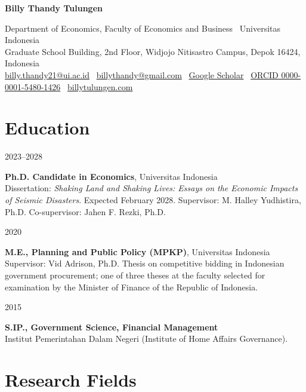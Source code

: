 \documentclass[11pt,a4paper]{article}
\newlength{\datecol}\setlength{\datecol}{0.155\textwidth}
\newlength{\bodycol}\setlength{\bodycol}{0.815\textwidth}
\newcommand{\entry}[2]{%
  \noindent
  \begin{minipage}[t]{\datecol}%
    \strut\raggedright\small\color{muted}#1%
  \end{minipage}%
  \hfill
  \begin{minipage}[t]{\bodycol}%
    \strut #2%
  \end{minipage}%
  \par\vspace{0.16em}}
\newcommand{\org}[1]{{\small\color{muted}#1}}
\begin{document}
{\LARGE\bfseries Billy Thandy Tulungen}

\vspace{0.45em}
{\color{muted}\small
Department of Economics, Faculty of Economics and Business \textperiodcentered\
Universitas Indonesia\\
Graduate School Building, 2nd Floor, Widjojo Nitisastro Campus, Depok 16424,
Indonesia\\[0.25em]
\href{mailto:billy.thandy21@ui.ac.id}{billy.thandy21@ui.ac.id}
\textperiodcentered\
\href{mailto:billythandy@gmail.com}{billythandy@gmail.com}
\textperiodcentered\
\href{https://scholar.google.com/citations?user=LchRWJsAAAAJ}{Google Scholar}
\textperiodcentered\
\href{https://orcid.org/0000-0001-5480-1426}{ORCID 0000-0001-5480-1426}
\textperiodcentered\
\mbox{\href{https://billytulungen.com}{billytulungen.com}}}

\vspace{0.5em}

\section{Education}

\entry{2023--2028}{%
  \textbf{Ph.D. Candidate in Economics}, Universitas Indonesia\\
  \org{Dissertation: \emph{Shaking Land and Shaking Lives: Essays on the
  Economic Impacts of Seismic Disasters}. Expected February 2028.
  Supervisor: M. Halley Yudhistira, Ph.D. Co-supervisor: Jahen F. Rezki,
  Ph.D.}}

\entry{2020}{%
  \textbf{M.E., Planning and Public Policy (MPKP)}, Universitas Indonesia\\
  \org{Supervisor: Vid Adrison, Ph.D. Thesis on competitive bidding in
  Indonesian government procurement; one of three theses at the faculty selected
  for examination by the Minister of Finance of the Republic of Indonesia.}}

\entry{2015}{%
  \textbf{S.IP., Government Science, Financial Management}\\
  \org{Institut Pemerintahan Dalam Negeri (Institute of Home Affairs
  Governance).}}

\section{Research Fields}
\end{document}
